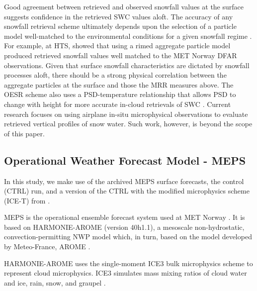 \documentclass{ametsocV5}
\begin{document}
		Good agreement between retrieved and observed snowfall values at the surface suggests confidence in the retrieved SWC values aloft. The accuracy of any snowfall retrieval scheme ultimately depends upon the selection of a particle model well-matched to the environmental conditions for a given snowfall regime \citep{cooper_variational_2017}. For example, at HTS,  \citet{schirle_estimation_2019} showed that using a rimed aggregate particle model produced retrieved snowfall values well matched to the MET Norway DFAR observations. Given that surface snowfall characteristics are dictated by snowfall processes aloft, there should be a strong physical correlation between the aggregate particles at the surface and those the MRR measures above. The OESR scheme also uses a PSD-temperature relationship that allows PSD to change with height for more accurate in-cloud retrievals of SWC  \citep{wood_estimation_2011}. Current research focuses on using airplane in-situ microphysical observations to evaluate retrieved vertical profiles of snow water.  Such work, however, is beyond the scope of this paper.
	



	\subsection{Operational Weather Forecast Model - MEPS}\label{sec:methodology:MEPS}
		In this study, we make use of the archived MEPS surface forecasts, the control (CTRL) run, and a version of the CTRL with the modified microphysics scheme (ICE-T) from \citet{engdahl_effects_2020}.

		MEPS is the operational ensemble forecast system used at MET Norway \citep{frogner_convection-permitting_2019}. It is based on HARMONIE-AROME (version 40h1.1), a mesoscale non-hydrostatic, convection-permitting NWP model \citep{the_metcoop_team_metcoop_2017} which, in turn, based on the model developed by Meteo-France, AROME \citep{seity_arome-france_2010,bengtsson_harmoniearome_2017}.

		HARMONIE-AROME uses the single-moment ICE3 bulk microphysics scheme \citep{caniaux_numerical_1994,pinty_mixed-phased_1998} to represent cloud microphysics. ICE3 simulates mass mixing ratios of cloud water and ice, rain, snow, and graupel \citep{cohard_comprehensive_2000, cohard_comprehensive_2000-1}.
\end{document}
